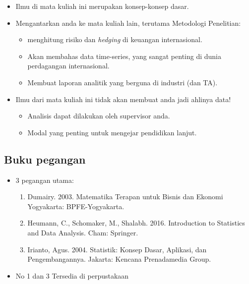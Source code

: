 \documentclass[
  letterpaper,
  DIV=11,
  numbers=noendperiod]{scrartcl}
\begin{document}
\begin{itemize}
\item
  Ilmu di mata kuliah ini merupakan konsep-konsep dasar.
\item
  Mengantarkan anda ke mata kuliah lain, terutama Metodologi Penelitian:

  \begin{itemize}
  \item
    menghitung risiko dan \emph{hedging} di keuangan internasional.
  \item
    Akan membahas data time-series, yang sangat penting di dunia
    perdagangan internasional.
  \item
    Membuat laporan analitik yang berguna di industri (dan TA).
  \end{itemize}
\item
  Ilmu dari mata kuliah ini tidak akan membuat anda jadi ahlinya data!

  \begin{itemize}
  \item
    Analisis dapat dilakukan oleh supervisor anda.
  \item
    Modal yang penting untuk mengejar pendidikan lanjut.
  \end{itemize}
\end{itemize}

\hypertarget{buku-pegangan}{%
\subsection{Buku pegangan}\label{buku-pegangan}}

\begin{itemize}
\item
  3 pegangan utama:

  \begin{enumerate}
  \def\labelenumi{\arabic{enumi}.}
  \item
    Dumairy. 2003. Matematika Terapan untuk Bisnis dan Ekonomi
    Yogyakarta: BPFE-Yogyakarta.
  \item
    Heumann, C., Schomaker, M., Shalabh. 2016. Introduction to
    Statistics and Data Analysis. Cham: Springer.
  \item
    Irianto, Agus. 2004. Statistik: Konsep Dasar, Aplikasi, dan
    Pengembangannya. Jakarta: Kencana Prenadamedia Group.
  \end{enumerate}
\item
  No 1 dan 3 Tersedia di perpustakaan
\end{itemize}
\end{document}
